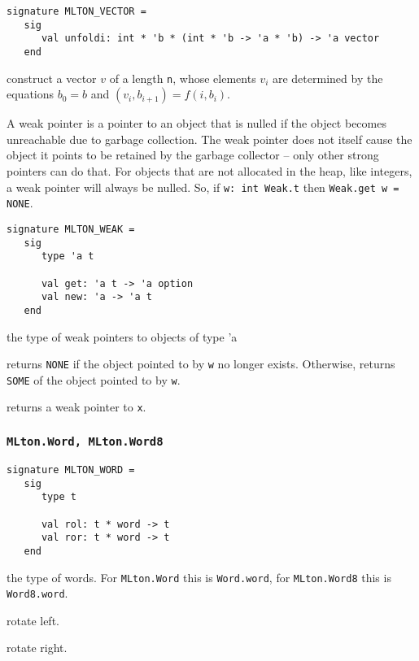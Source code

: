 \begin{verbatim}
signature MLTON_VECTOR =
   sig
      val unfoldi: int * 'b * (int * 'b -> 'a * 'b) -> 'a vector
   end
\end{verbatim}

\begin{description}

construct a vector $v$ of a length {\tt n}, whose elements $v_i$ are determined
by the equations $b_0 = b$ and $(v_i, b_{i+1}) = f (i, b_i)$.

\end{description}

A weak pointer is a pointer to an object that is nulled if the
object becomes unreachable due to garbage collection.  The weak
pointer does not itself cause the object it points to be retained by
the garbage collector -- only other strong pointers can do that.
For objects that are not allocated in the heap, like integers, a weak
pointer will always be nulled.  So, if {\tt w: int Weak.t} then
{\tt Weak.get w = NONE}.
\begin{verbatim}
signature MLTON_WEAK =
   sig
      type 'a t

      val get: 'a t -> 'a option
      val new: 'a -> 'a t
   end
\end{verbatim}

\begin{description}
the type of weak pointers to objects of type 'a

returns {\tt NONE} if the object pointed to by {\tt w} no longer
exists.  Otherwise, returns {\tt SOME} of the object pointed to by
{\tt w}.

returns a weak pointer to {\tt x}.
\end{description}
%
\subsubsection{\tt MLton.Word, MLton.Word8}

\begin{verbatim}
signature MLTON_WORD =
   sig
      type t
	 
      val rol: t * word -> t
      val ror: t * word -> t
   end
\end{verbatim}

\begin{description}
the type of words.  For {\tt MLton.Word} this is {\tt Word.word}, for
{\tt MLton.Word8} this is {\tt Word8.word}.

rotate left.

rotate right.
\end{description}

